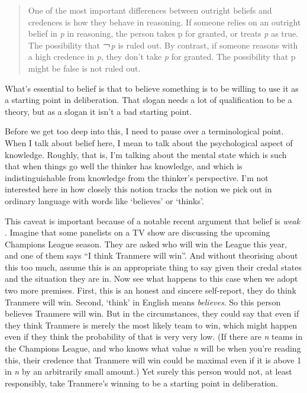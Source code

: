 \documentclass[
  11pt,
]{book}
\begin{document}
\begin{quote}
One of the most important differences between outright beliefs and credences is how they behave in reasoning. If someone relies on an outright belief in \emph{p} in reasoning, the person takes p for granted, or treats \emph{p} as true. The possibility that ￢\emph{p} is ruled out. By contrast, if someone reasons with a high credence in \emph{p}, they don't take \emph{p} for granted. The possibility that p might be false is not ruled out. \citep[939]{Staffel2019}
\end{quote}

What's essential to belief is that to believe something is to be willing to use it as a starting point in deliberation. That slogan needs a lot of qualification to be a theory, but as a slogan it isn't a bad starting point.

Before we get too deep into this, I need to pause over a terminological point. When I talk about belief here, I mean to talk about the psychological aspect of knowledge. Roughly, that is, I'm talking about the mental state which is such that when things go well the thinker has knowledge, and which is indistinguishable from knowledge from the thinker's perspective. I'm not interested here in how closely this notion tracks the notion we pick out in ordinary language with words like `believes' or `thinks'.

This caveat is important because of a notable recent argument that belief is \emph{weak} \citep{HawthorneEtAl2015}. Imagine that some panelists on a TV show are discussing the upcoming Champions League season. They are asked who will win the League this year, and one of them says ``I think Tranmere will win''. And without theorising about this too much, assume this is an appropriate thing to say given their credal states and the situation they are in. Now see what happens to this case when we adopt two more premises. First, this is an honest and sincere self-report, they do think Tranmere will win. Second, `think' in English means \emph{believes}. So this person believes Tranmere will win. But in the circumstances, they could say that even if they think Tranmere is merely the most likely team to win, which might happen even if they think the probability of that is very very low. (If there are \emph{n} teams in the Champions League, and who knows what value \emph{n} will be when you're reading this, their credence that Tranmere will win could be maximal even if it is above 1 in \emph{n} by an arbitrarily small amount.) Yet surely this person would not, at least responsibly, take Tranmere's winning to be a starting point in deliberation.
\end{document}
